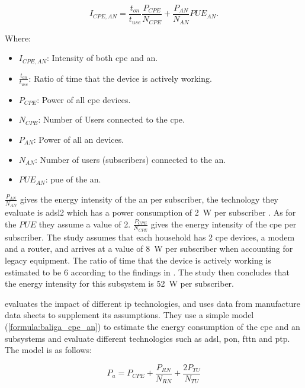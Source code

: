 \begin{equation}
\label{formula:coroama_cpe_an}
    I_{CPE,AN} = \frac{t_{on}}{t_{use}} \frac{P_{CPE}}{N_{CPE}} + \frac{P_{AN}}{N_{AN}} PUE_{AN}.
\end{equation}

Where: 

\begin{itemize}
    \item $I_{CPE,AN}$: Intensity of both \ac{cpe} and \ac{an}.
    \item $\frac{t_{on}}{t_{use}}$: Ratio of time that the device is actively working. 
    \item $P_{CPE}$: Power of all \ac{cpe} devices.
    \item $N_{CPE}$: Number of Users connected to the \ac{cpe}.
    \item $P_{AN}$: Power of all \ac{an} devices.
    \item $N_{AN}$: Number of users (subscribers) connected to the \ac{an}.
    \item $PUE_{AN}$: \ac{pue} of the \ac{an}.
\end{itemize}

$\frac{P_{AN}}{N_{AN}}$ gives the energy intensity of the \ac{an} per subscriber, the technology they evaluate is \ac{adsl2} which has a power consumption of \SI{2}{\watt} per subscriber \citet{Schien2013}. As for the $PUE$ they assume a value of 2. 
$\frac{P_{CPE}}{N_{CPE}}$ gives the energy intensity of the \ac{cpe} per subscriber. The study assumes that each household has 2 \ac{cpe} devices, a modem and a router, and arrives at a value of \SI{8}{\watt} per subscriber when accounting for legacy equipment. 
The ratio of time that the device is actively working is estimated to be 6 according to the findings in \citet{Nissen2007}.
The study then concludes that the energy intensity for this subsystem is \SI{52}{\watt} per subscriber.


\citet{Baliga2009} evaluates the impact of different \ac{ip} technologies, and uses data from manufacture data sheets to supplement its assumptions. They use a simple model (\ref{formula:baliga_cpe_an}) to estimate the energy consumption of the \ac{cpe} and \ac{an} subsystems and evaluate different technologies such as \ac{adsl}, \ac{pon}, \ac{fttn} and \ac{ptp}. The model is as follows:  

\begin{equation}
\label{formula:baliga_cpe_an}
    P_a = P_{CPE} + \frac{P_{RN}}{N_{RN}} + \frac{2P_{TU}}{N_{TU}}
\end{equation}

